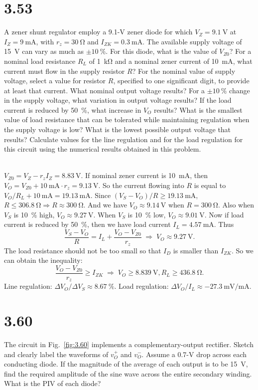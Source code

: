 \documentclass[12pt, a4paper]{article}
\theoremstyle{mystyle}	%
\newcommand{\Ans}{\noindent{\bf Ans:}}
\begin{document}
\section{3.53}
A zener shunt regulator employ a 9.1-\si{\V} zener diode for which
$V_Z = \SI{9.1}{\V}$ at $I_Z = \SI{9}{\mA}$, with $r_z = \SI{30}{\ohm}$
and $I_{ZK}=\SI{0.3}{\mA}$. The available supply voltage of \SI{15}{\V}
can vary as much as $\pm\SI{10}{\percent}$. For this diode, what is the
value of $V_{Z0}$? For a nominal load resistance $R_L$ of \SI{1}{\kohm}
and a nominal zener current of \SI{10}{\mA}, what current must flow
in the supply resistor $R$? For the nominal value of supply voltage,
select a value for resistor $R$, specified to one significant digit,
to provide at least that current. What nominal output voltage results?
For a $\pm\SI{10}{\percent}$ change in the supply voltage, what variation
in output voltage results? If the load current is reduced by
\SI{50}{\percent}, what increase in $V_O$ results? What is the smallest
value of load resistance that can be tolerated while maintaining
regulation when the supply voltage is low? What is the lowest possible
output voltage that results? Calculate values for the line regulation
and for the load regulation for this circuit using the numerical results
obtained in this problem.

\Ans \\
$V_{Z0} = V_Z - r_z I_Z = \SI{8.83}{\V}$. If nominal zener current is
\SI{10}{\mA}, then $V_O = V_{Z0} + \SI{10}{\mA} \cdot r_z = \SI{9.13}{\V}$.
So the current flowing into $R$ is equal to $V_O/R_L + \SI{10}{\mA} =
\SI{19.13}{\mA}$. Since $(V_S - V_O)/R \ge \SI{19.13}{\mA}$,
$R \le \SI{306.8}{\ohm} \Rightarrow R \approx \SI{300}{\ohm}$. And we have
$V_O \approx \SI{9.14}{\V}$ when $R = \SI{300}{\ohm}$. Also when $V_S$ is
\SI{10}{\percent} high, $V_O \approx \SI{9.27}{\V}$. When $V_S$ is
\SI{10}{\percent} low, $V_O \approx \SI{9.01}{\V}$. Now if load current is
reduced by \SI{50}{\percent}, then we have load current
$I_L = \SI{4.57}{\mA}$. Thus
\[ \frac{V_S - V_O}{R} = I_L + \frac{V_O - V_{Z0}}{r_z}
  \; \Rightarrow \; V_O \approx \SI{9.27}{\V}. \]
The load resistance should not be too small so that $I_D$ is smaller than
$I_{ZK}$. So we can obtain the inequality:
\[ \frac{V_O - V_{Z0}}{r_z} \ge I_{ZK} \; \Rightarrow \;
V_O \ge \SI{8.839}{\V}, R_L \ge \SI{436.8}{\ohm}. \]
Line regulation: $\Delta V_O/ \Delta V_S \approx \SI{8.67}{\percent}$.
Load regulation: $\Delta V_O/I_L \approx \SI{-27.3}{\mV/\mA}$.

\section{3.60}
The circuit in Fig.~\ref{fig:3.60} implements a complementary-output
rectifier. Sketch and clearly label the waveforms of $v_O^+$ and $v_O^-$.
Assume a 0.7-\si{\V} drop across each conducting diode. If the
magnitude of the average of each output is to be \SI{15}{\V}, find
the required amplitude of the sine wave across the entire secondary
winding. What is the PIV of each diode?
\end{document}
